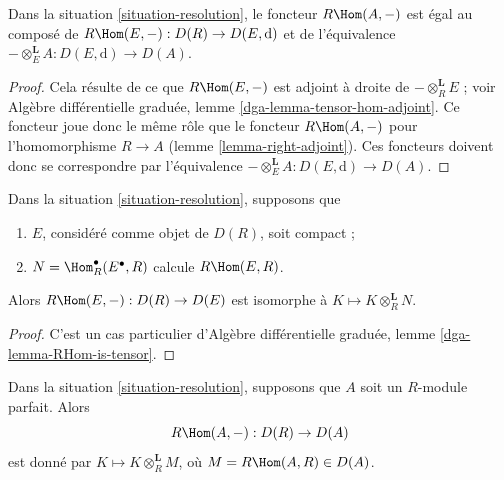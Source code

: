 \begin{lemma}
\label{lemma-RHom-dga}
Dans la situation \ref{situation-resolution}, le foncteur $R\Hom(A, -)$ est égal au composé de
$R\Hom(E, -) : D(R) \to D(E, \text{d})$
et de l'équivalence $- \otimes^\mathbf{L}_E A : D(E, \text{d}) \to D(A)$.
\end{lemma}

\begin{proof}
Cela résulte de ce que $R\Hom(E, -)$ est adjoint à droite
de $- \otimes^\mathbf{L}_R E$ ; voir Algèbre différentielle graduée, lemme \ref{dga-lemma-tensor-hom-adjoint}.
Ce foncteur joue donc le même rôle que le foncteur $R\Hom(A, -)$
pour l'homomorphisme $R \to A$ (lemme \ref{lemma-right-adjoint}).
Ces foncteurs doivent donc se correspondre par l'équivalence
$- \otimes^\mathbf{L}_E A : D(E, \text{d}) \to D(A)$.
\end{proof}

\begin{lemma}
\label{lemma-RHom-is-tensor}
Dans la situation \ref{situation-resolution}, supposons que
\begin{enumerate}
\item $E$, considéré comme objet de $D(R)$, soit compact ;
\item $N = \Hom^\bullet_R(E^\bullet, R)$ calcule $R\Hom(E, R)$.
\end{enumerate}
Alors $R\Hom(E, -) : D(R) \to D(E)$ est isomorphe à
$K \mapsto K \otimes_R^\mathbf{L} N$.
\end{lemma}

\begin{proof}
C'est un cas particulier d'Algèbre différentielle graduée, lemme \ref{dga-lemma-RHom-is-tensor}.
\end{proof}

\begin{lemma}
\label{lemma-RHom-is-tensor-special}
Dans la situation \ref{situation-resolution}, supposons que $A$ soit un $R$-module parfait.
Alors
$$
R\Hom(A, -) : D(R) \to D(A)
$$
est donné par $K \mapsto K \otimes_R^\mathbf{L} M$,
où $M = R\Hom(A, R) \in D(A)$.
\end{lemma}

